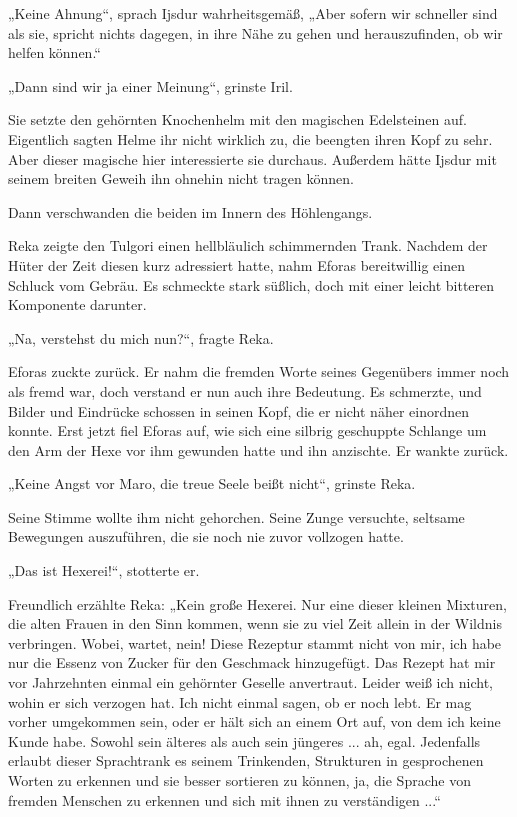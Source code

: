 „Keine Ahnung“, sprach Ijsdur wahrheitsgemäß, „Aber sofern wir schneller sind als sie, spricht nichts dagegen, in ihre Nähe zu gehen und herauszufinden, ob wir helfen können.“

„Dann sind wir ja einer Meinung“, grinste Iril.

Sie setzte den gehörnten Knochenhelm mit den magischen Edelsteinen auf. Eigentlich sagten Helme ihr nicht wirklich zu, die beengten ihren Kopf zu sehr. Aber dieser magische hier interessierte sie durchaus. Außerdem hätte Ijsdur mit seinem breiten Geweih ihn ohnehin nicht tragen können.

Dann verschwanden die beiden im Innern des Höhlengangs.



\trennzeichen



Reka zeigte den Tulgori einen hellbläulich schimmernden Trank. Nachdem der Hüter der Zeit diesen kurz adressiert hatte, nahm Eforas bereitwillig einen Schluck vom Gebräu. Es schmeckte stark süßlich, doch mit einer leicht bitteren Komponente darunter.

„Na, verstehst du mich nun?“, fragte Reka.

Eforas zuckte zurück. Er nahm die fremden Worte seines Gegenübers immer noch als fremd war, doch verstand er nun auch ihre Bedeutung. Es schmerzte, und Bilder und Eindrücke schossen in seinen Kopf, die er nicht näher einordnen konnte. Erst jetzt fiel Eforas auf, wie sich eine silbrig geschuppte Schlange um den Arm der Hexe vor ihm gewunden hatte und ihn anzischte. Er wankte zurück.

„Keine Angst vor Maro, die treue Seele beißt nicht“, grinste Reka.

Seine Stimme wollte ihm nicht gehorchen. Seine Zunge versuchte, seltsame Bewegungen auszuführen, die sie noch nie zuvor vollzogen hatte.

„Das ist Hexerei!“, stotterte er.

Freundlich erzählte Reka: „Kein große Hexerei. Nur eine dieser kleinen Mixturen, die alten Frauen in den Sinn kommen, wenn sie zu viel Zeit allein in der Wildnis verbringen. Wobei, wartet, nein! Diese Rezeptur stammt nicht von mir, ich habe nur die Essenz von Zucker für den Geschmack hinzugefügt. Das Rezept hat mir vor Jahrzehnten einmal ein gehörnter Geselle anvertraut. Leider weiß ich nicht, wohin er sich verzogen hat. Ich nicht einmal sagen, ob er noch lebt. Er mag vorher umgekommen sein, oder er hält sich an einem Ort auf, von dem ich keine Kunde habe. Sowohl sein älteres als auch sein jüngeres ... ah, egal. Jedenfalls erlaubt dieser Sprachtrank es seinem Trinkenden, Strukturen in gesprochenen Worten zu erkennen und sie besser sortieren zu können, ja, die Sprache von fremden Menschen zu erkennen und sich mit ihnen zu verständigen ...“

